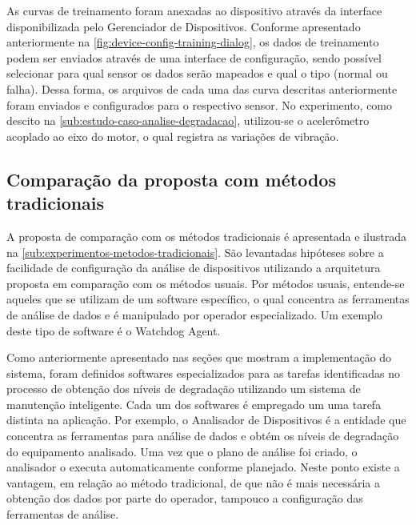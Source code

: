 As curvas de treinamento foram anexadas ao dispositivo através da interface disponibilizada pelo
Gerenciador de Dispositivos. Conforme apresentado anteriormente na
\cref{fig:device-config-training-dialog}, os dados de treinamento podem ser enviados através de uma
interface de configuração, sendo possível selecionar para qual sensor os dados serão mapeados e qual
o tipo (normal ou falha). Dessa forma, os arquivos de cada uma das curva descritas anteriormente
foram enviados e configurados para o respectivo sensor. No experimento, como descito na
\cref{sub:estudo-caso-analise-degradacao}, utilizou-se o acelerômetro acoplado ao eixo do motor, o
qual registra as variações de vibração.


\subsection{Comparação da proposta com métodos tradicionais}

A proposta de comparação com os métodos tradicionais é apresentada e ilustrada na
\cref{sub:experimentos-metodos-tradicionais}. São levantadas hipóteses sobre a facilidade de
configuração da análise de dispositivos utilizando a arquitetura proposta em comparação com os
métodos usuais. Por métodos usuais, entende-se aqueles que se utilizam de um software específico, o
qual concentra as ferramentas de análise de dados e é manipulado por operador especializado. Um
exemplo deste tipo de software é o Watchdog Agent.

Como anteriormente apresentado nas seções que mostram a implementação do sistema, foram definidos
softwares especializados para as tarefas identificadas no processo de obtenção dos níveis de
degradação utilizando um sistema de manutenção inteligente. Cada um dos softwares é empregado um uma
tarefa distinta na aplicação. Por exemplo, o Analisador de Dispositivos é a entidade que concentra
as ferramentas para análise de dados e obtém os níveis de degradação do equipamento analisado. Uma
vez que o plano de análise foi criado, o analisador o executa automaticamente conforme planejado.
Neste ponto existe a vantagem, em relação ao método tradicional, de que não é mais necessária a
obtenção dos dados por parte do operador, tampouco a configuração das ferramentas de análise.

